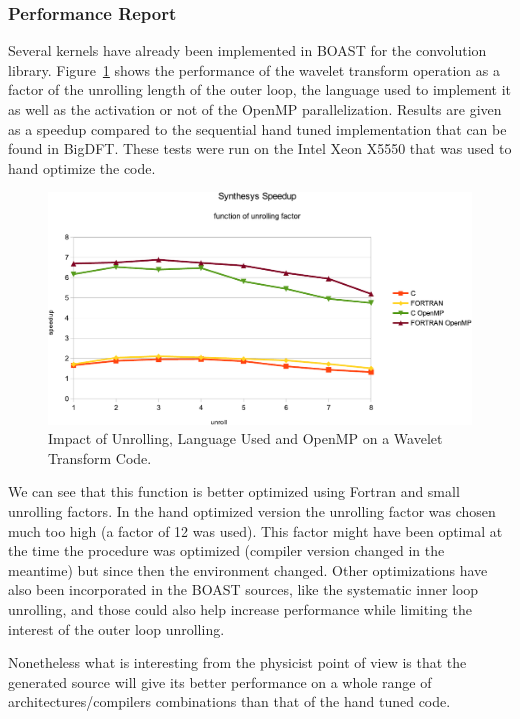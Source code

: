 \documentclass{IEEEtran}
\begin{document}
\subsubsection{Performance Report}

Several kernels have already been implemented in BOAST for the convolution
library. Figure~\ref{fig:synthesis} shows the performance of the wavelet
transform operation as a factor of the unrolling length of the outer loop, the
language used to implement it as well as the activation or not of the OpenMP
parallelization. Results are given as a speedup compared to the sequential hand
tuned implementation that can be found in BigDFT. These tests were run on the
Intel Xeon X5550 that was used to hand optimize the code.

\begin{figure}
\begin{center}
\includegraphics[width=\linewidth]{Res_synthesis}
\end{center}
\caption{Impact of Unrolling, Language Used and OpenMP on a Wavelet Transform Code.}
\label{fig:synthesis}
\end{figure}

We can see that this function is better optimized using Fortran and small
unrolling factors. In the hand optimized version the unrolling factor was chosen
much too high (a factor of 12 was used). This factor might have been optimal at
the time the procedure was optimized (compiler version changed in the meantime) but
since then the environment changed. Other optimizations have also been
incorporated in the BOAST sources, like the systematic inner loop unrolling, and
those could also help increase performance while limiting the interest of the
outer loop unrolling.

Nonetheless what is interesting from the physicist point of view is that the
generated source will give its better performance on a whole range of
architectures/compilers combinations than that of the hand tuned code.
\end{document}
